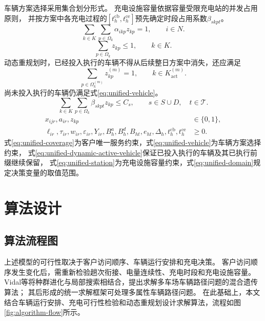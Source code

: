 \documentclass{setp-new}
\begin{document}
车辆方案选择采用集合划分形式\cite{ref:sahin}。
充电设施容量依据容量受限充电站的并发占用原则\cite{ref:12}，
并按方案中各充电过程的$[t_h^{\mathrm{cb}},t_h^{\mathrm{ce}}]$预先确定时段占用系数$\beta_{skpt}$。
\begin{equation}
\sum_{k\in K}\sum_{p\in\Omega_k}\alpha_{ikp}z_{kp}=1,
\qquad i\in N .
\label{eq:unified-coverage}
\end{equation}
\begin{equation}
\sum_{p\in\Omega_k}z_{kp}\le1,
\qquad k\in K .
\label{eq:unified-vehicle}
\end{equation}
动态重规划时，已经投入执行的车辆不得从后续整日方案中消失，还应满足
\begin{equation}
\sum_{p\in\Omega_k^{(m)}}z_{kp}^{(m)}=1,
\qquad k\in K_{\mathrm{act}}^{(m)}.
\label{eq:unified-dynamic-active-vehicle}
\end{equation}
尚未投入执行的车辆仍满足式\eqref{eq:unified-vehicle}。
\begin{equation}
\sum_{k\in K}\sum_{p\in\Omega_k}\beta_{skpt}z_{kp}\le C_s,
\qquad s\in S\cup D,\quad t\in\mathcal T .
\label{eq:unified-station}
\end{equation}
\begin{equation}
\begin{aligned}
x_{ijr},a_{ir},z_{kp}&\in\{0,1\},\\
\ell_{ir},\tau_{ir},w_{ir},\varepsilon_{ir},Y_{ir},
B_h^{a},B_h^{d},B_{ht},e_{ht},\Delta_h,
t_h^{\mathrm{cb}},t_h^{\mathrm{ce}}&\ge0 .
\end{aligned}
\label{eq:unified-domain}
\end{equation}
式\eqref{eq:unified-coverage}为客户唯一服务约束，式\eqref{eq:unified-vehicle}为车辆方案选择约束，
式\eqref{eq:unified-dynamic-active-vehicle}保证已投入执行的车辆及其已执行前缀继续保留，
式\eqref{eq:unified-station}为充电设施容量约束，式\eqref{eq:unified-domain}规定决策变量的取值范围。

\section{算法设计}

\subsection{算法流程图}

上述模型的可行性取决于客户访问顺序、车辆运行安排和充电决策。
客户访问顺序发生变化后，需重新检验趟次衔接、电量连续性、充电时段和充电设施容量。
Vidal等\cite{ref:76}将种群进化与局部搜索相结合，提出求解多车场车辆路径问题的混合遗传算法；
其后形成的统一求解框架可处理多属性车辆路径问题\cite{ref:77}。
在此基础上，本文结合车辆运行安排、充电可行性检验和动态重规划设计求解算法，流程如图\ref{fig:algorithm-flow}所示。
\end{document}

